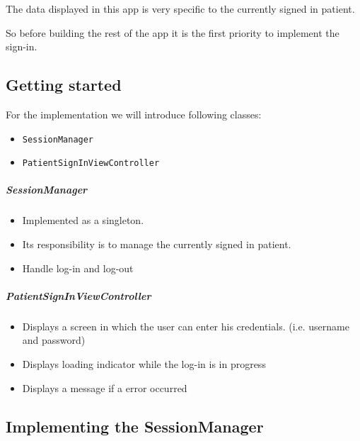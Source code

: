 \documentclass{article}
\begin{document}
The data displayed in this app is very specific to the currently signed
in patient.

So before building the rest of the app it is the first priority to
implement the sign-in.

\subsection{Getting started}\label{step5:getting-started}

For the implementation we will introduce following classes:

\begin{itemize}

\item
  \texttt{SessionManager}
\item
  \texttt{PatientSignInViewController}
\end{itemize}

\subparagraph{SessionManager}\label{sessionmanager}

\begin{itemize}

\item
  Implemented as a singleton.
\item
  Its responsibility is to manage the currently signed in patient.
\item
  Handle log-in and log-out
\end{itemize}

\subparagraph{PatientSignInViewController}\label{patientsigninviewcontroller}

\begin{itemize}

\item
  Displays a screen in which the user can enter his credentials.
  (i.e. username and password)
\item
  Displays loading indicator while the log-in is in progress
\item
  Displays a message if a error occurred
\end{itemize}

\subsection{Implementing the
SessionManager}\label{implementing-the-sessionmanager}
\end{document}
